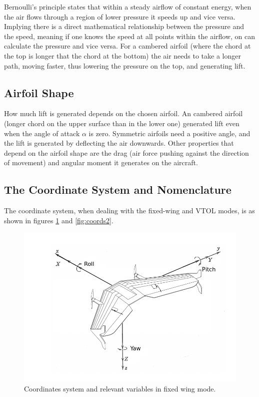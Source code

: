 Bernoulli's principle states that within a steady airflow of constant energy, when the air flows through a region of lower pressure it speeds up and vice versa. Implying there is a direct mathematical relationship between the pressure and the speed, meaning if one knows the speed at all points within the airflow, on can calculate the pressure and vice versa. For a cambered airfoil (where the chord at the top is longer that the chord at the bottom) the air needs to take a longer path, moving faster, thus lowering the pressure on the top, and generating lift.


\subsection{Airfoil Shape}
How much lift is generated depends on the chosen airfoil.
%
An cambered airfoil (longer chord on the upper surface than in the lower one) generated lift even when the angle of attack $\alpha$ is zero.
Symmetric airfoils need a positive angle, and the lift is generated by deflecting the air downwards.
Other properties that depend on the airfoil shape are the drag (air force pushing against the direction of movement) and angular moment it generates on the aircraft. 

\subsection{The Coordinate System and Nomenclature}

The coordinate system, when dealing with the fixed-wing and VTOL modes, is as shown in figures \ref{fig:coords1} and \ref{fig:coords2}.

\begin{figure}[h]
\centering
  \includegraphics[width=0.8\linewidth]{figs/axisfixedwing.png}
  \caption{Coordinates system and relevant variables in fixed wing mode.}
  \label{fig:coords1}
\end{figure}


